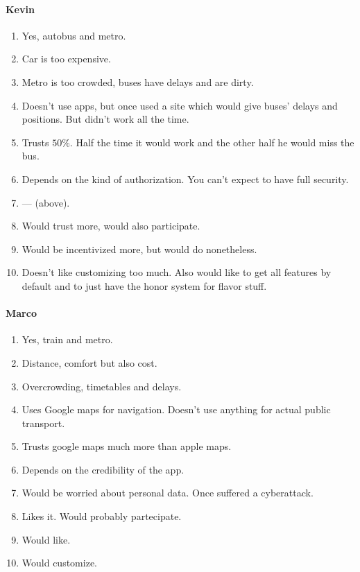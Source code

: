 \documentclass[a4paper, 11pt, twocolumn]{article}
\begin{document}
\paragraph*{Kevin}
\begin{enumerate}
	\item Yes, autobus and metro.
	\item Car is too expensive.
	\item Metro is too crowded, buses have delays and are dirty.
	\item Doesn't use apps, but once used a site which would give buses' delays and positions. But didn't work all the time.
	\item Trusts $50\%$. Half the time it would work and the other half he would miss the bus.
	\item Depends on the kind of authorization. You can't expect to have full security.
	\item --- (above).
	\item Would trust more, would also participate.
	\item Would be incentivized more, but would do nonetheless.
	\item Doesn't like customizing too much. Also would like to get all features by default and to just have the honor system for flavor stuff.
\end{enumerate}


\paragraph*{Marco}
\begin{enumerate}
	\item Yes, train and metro.
	\item Distance, comfort but also cost.
	\item Overcrowding, timetables and delays.
	\item Uses Google maps for navigation. Doesn't use anything for actual public transport.
	\item Trusts google maps much more than apple maps.
	\item Depends on the credibility of the app.
	\item Would be worried about personal data. Once suffered a cyberattack.
	\item Likes it. Would probably partecipate.
	\item Would like.
	\item Would customize.
\end{enumerate}
\end{document}
